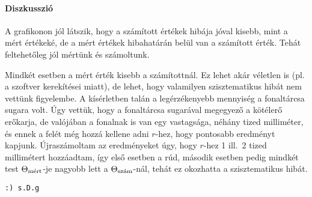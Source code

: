 \documentclass[10pt]{article}
\begin{document}
\paragraph*{Diszkusszió}
A grafikonon jól látszik, hogy a számított értékek hibája jóval kisebb, mint a mért értékeké, de a mért értékek hibahatárán belül van a számított érték. Tehát feltehetőleg jól mértünk és számoltunk.

Mindkét esetben a mért érték kisebb a számítottnál. Ez lehet akár véletlen is (pl. a szoftver kerekítései miatt), de lehet, hogy valamilyen szisztematikus hibát nem vettünk figyelembe. A kísérletben talán a legérzékenyebb mennyiség a fonaltárcsa sugara volt. Úgy vettük, hogy a fonaltárcsa sugarával megegyező a kötélerő erőkarja, de valójában a fonalnak is van egy vastagsága, néhány tized milliméter, és ennek a felét még hozzá kellene adni $r$-hez, hogy pontosabb eredményt kapjunk. Újraszámoltam az eredményeket úgy, hogy $r$-hez 1 ill.\ 2 tized millimétert hozzáadtam, így első esetben a rúd, második esetben pedig mindkét test $\Thetamert$-je nagyobb lett a $\Thetaszam$-nál, tehát ez okozhatta a szisztematikus hibát.

\texttt{:) s.D.g}
\end{document}
